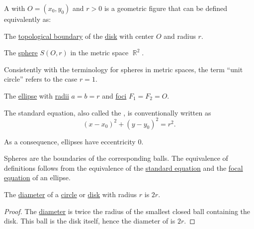 \begin{definition}\label{def:circle}\mimprovised
  A  with  \( O = (x_0, y_0) \) and  \( r > 0 \) is a geometric figure that can be defined equivalently as:

  \begin{thmenum}[series=def:circle]
     The \hyperref[def:topological_boundary_operator]{topological boundary} of the \hyperref[def:disk]{disk} with center \( O \) and radius \( r \).

     The \hyperref[def:metric_space/sphere]{sphere} \( S(O, r) \) in the metric space \( \BbbR^2 \).

    Consistently with the terminology for spheres in metric spaces, the term \enquote{unit circle} refers to the case \( r = 1 \).

     The \hyperref[def:ellipse]{ellipse} with \hyperref[def:ellipse]{radii} \( a = b = r \) and \hyperref[def:ellipse/foci]{foci} \( F_1 = F_2 = O \).

    The standard equation, also called the , is conventionally written as
    \begin{equation}\label{eq:def:circle/ellipse/central_equation}
      (x - x_0)^2 + (y - y_0)^2 = r^2.
    \end{equation}

    As a consequence, ellipses have eccentricity \( 0 \).
  \end{thmenum}
\end{definition}
\begin{defproof}
   Spheres are the boundaries of the corresponding balls.
   The equivalence of definitions follows from the equivalence of the \hyperref[def:ellipse/focal_equation]{standard equation} and the \hyperref[def:ellipse/focal_equation]{focal equation} of an ellipse.
\end{defproof}

\begin{proposition}\label{thm:circle_diameter}
  The \hyperref[def:metric_space/diameter]{diameter} of a \hyperref[def:circle]{circle} or \hyperref[def:disk]{disk} with radius \( r \) is \( 2r \).
\end{proposition}
\begin{proof}
  The \hyperref[def:metric_space/diameter]{diameter} is twice the radius of the smallest closed ball containing the disk. This ball is the disk itself, hence the diameter of is \( 2r \).
\end{proof}

